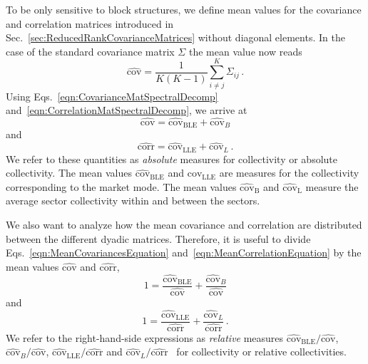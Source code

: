 \documentclass[aps, pra, groupedaddress, showkeys, twocolumn, floatfix, 10pt]{revtex4-2}
\newcommand*\meanNONDiag[1]{\widehat{#1}}
\begin{document}
To be only sensitive to block structures, we define mean values for the covariance and correlation matrices introduced in Sec.~\ref{sec:ReducedRankCovarianceMatrices} without diagonal elements.
In the case of the standard covariance matrix $\Sigma$ the mean value now reads
%
\begin{equation} \label{eqn:MeanCovariance_NONDiag}
	\meanNONDiag{\text{cov}} = \frac{1}{K (K-1)} \sum_{i \neq j}^K \Sigma_{ij} \,.
\end{equation}
%
Using Eqs.~\eqref{eqn:CovarianceMatSpectralDecomp} and~\eqref{eqn:CorrelationMatSpectralDecomp}, we arrive at
%
\begin{equation} \label{eqn:MeanCovariancesEquation}
	\meanNONDiag{\text{cov}} = \meanNONDiag{\text{cov}}_{\text{BLE}} + \meanNONDiag{\text{cov}}_{B}
\end{equation}
%
and
%
%
\begin{equation} \label{eqn:MeanCorrelationEquation}
	\meanNONDiag{\text{corr}} = \meanNONDiag{\text{cov}}_{\text{LLE}} + \meanNONDiag{\text{cov}}_{L} \,.
\end{equation}
%
We refer to these quantities as \textit{absolute} measures for collectivity or absolute collectivity.
The mean values $\meanNONDiag{\text{cov}}_{\text{BLE}}$ and $\meanNONDiag{\text{cov}}_{\text{LLE}}$ are measures
for the collectivity corresponding to the market mode.
The mean values $\meanNONDiag{\text{cov}}_{\text{B}}$ and $\meanNONDiag{\text{cov}}_{\text{L}}$ measure the average sector collectivity within and between the sectors.

We also want to analyze how the mean covariance and correlation are distributed between the different dyadic matrices.
Therefore, it is useful to divide Eqs.~\eqref{eqn:MeanCovariancesEquation} and~\eqref{eqn:MeanCorrelationEquation} by the mean values $\meanNONDiag{\text{cov}}$ and $\meanNONDiag{\text{corr}}$,
%
\begin{equation} \label{eqn:MeanCovariancesEquationRel}
	1 = \frac{\meanNONDiag{\text{cov}}_{\text{BLE}}}{\meanNONDiag{\text{cov}}} + \frac{\meanNONDiag{\text{cov}}_{B}}{\meanNONDiag{\text{cov}}}
\end{equation}
%  
and
%
\begin{equation} \label{eqn:MeanCorrelationEquationRel}
	1 = \frac{\meanNONDiag{\text{cov}}_{\text{LLE}}}{\meanNONDiag{\text{corr}} } + \frac{\meanNONDiag{\text{cov}}_{L}}{\meanNONDiag{\text{corr}} } \,.
\end{equation}
%
We refer to the  right-hand-side expressions as \textit{relative} measures
$\meanNONDiag{\text{cov}}_{\text{BLE}}   /  \meanNONDiag{\text{cov}}  $, $\meanNONDiag{\text{cov}}_{B}   /  \meanNONDiag{\text{cov}} $, $\meanNONDiag{\text{cov}}_{\text{LLE}}   /  \meanNONDiag{\text{corr}} $ and
$\meanNONDiag{\text{cov}}_{L} / \meanNONDiag{\text{corr}}$~  
for collectivity or relative collectivities.
\end{document}
